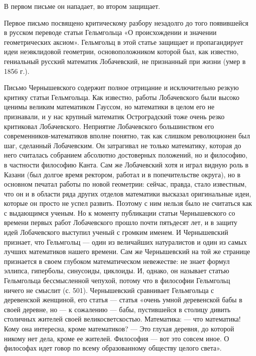 В первом письме он нападает, во втором защищает.

Первое письмо посвящено критическому разбору незадолго до того
появившейся в русском переводе статьи Гельмгольца «О происхождении и
значении геометрических аксиом». Гельмгольц в этой статье защищает и
пропагандирует идеи неэвклидовой геометрии, основоположником которой
был, как известно, гениальный русский математик Лобачевский, не
признанный при жизни (умер в 1856 г.).

Письмо Чернышевского содержит полное отрицание и исключительно резкую критику
статьи Гельмгольца. Как известно, работы Лобачевского были высоко ценимы
великим математиком Гауссом, но математики в целом его не признавали, и у нас
крупный математик Остроградский тоже очень резко критиковал Лобачевского.
Неприятие Лобачевского большинством его современников-математиков вполне
понятно, так как слишком революционен был шаг, сделанный Лобачевским. Он
затрагивал не только математику, которая до него считалась собранием абсолютно
достоверных положений, но и философию, в частности философию Канта. Сам же
Лобачевский хотя и играл видную роль в Казани (был долгое время ректором,
работал и в попечительстве округа), но в основном печатал работы по новой
геометрии: сейчас, правда, стало известным, что он и в области ряда других
отделов математики высказал оригинальные идеи, которые он просто не успел
развить. Поэтому с ним нельзя было не считаться как с выдающимся ученым. Но к
моменту публикации статьи Чернышевского со времени первых работ Лобачевского
прошло почти пятьдесят лет, и в защиту идей Лобачевского выступил ученый с
громким именем. И Чернышевский признает, что Гельмгольц --- один из величайших
натуралистов и один из самых лучших математиков нашего времени. Сам же
Чернышевский на той же странице признается в своем глубоком математическом
невежестве: не знает формул эллипса, гиперболы, синусоиды, циклоиды. И, однако,
он называет статью Гельмгольца бессмысленной чепухой, потому что в философии
Гельмгольц ничего не смыслит (с. 501). Чернышевский сравнивает Гельмгольца с
деревенской женщиной, его статья --- статья «очень умной деревенской бабы в своей
деревне, но --- к сожалению --- бабы, пустившейся в столицу дивить столичных
жителей своей великосветскостью. Математика: --- что математика! Кому она
интересна, кроме математиков? --- Это глухая деревня, до которой никому нет дела,
кроме ее жителей. Философия --- вот это совсем иное. О философах идет говор по
всему образованному обществу целого света».

